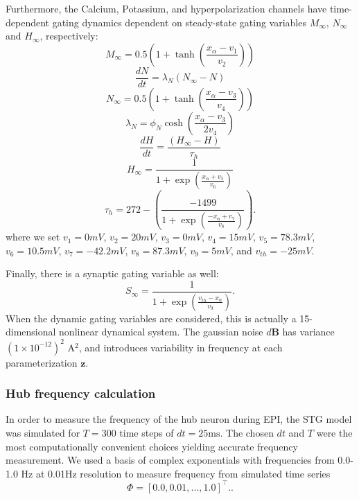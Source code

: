 \documentclass[11pt]{article}
\begin{document}
Furthermore, the Calcium, Potassium, and hyperpolarization channels have time-dependent gating dynamics dependent on steady-state gating variables $M_\infty$, $N_\infty$ and $H_\infty$, respectively:
\begin{equation}  M_{\infty} = 0.5 \left( 1 + \tanh \left( \frac{x_\alpha - v_1}{v_2} \right) \right) \end{equation}
\begin{equation}  \frac{dN}{dt} = \lambda_N (N_\infty - N)  \end{equation}
\begin{equation}  N_\infty = 0.5 \left( 1 + \tanh \left( \frac{x_\alpha - v_3}{v_4} \right) \right) \end{equation}
\begin{equation}  \lambda_N = \phi_N \cosh \left( \frac{x_\alpha - v_3}{2 v_4} \right) \end{equation}
\begin{equation}  \frac{dH}{dt} = \frac{\left( H_\infty - H \right)}{\tau_h} \end{equation}
\begin{equation}  H_\infty = \frac{1}{1 + \exp \left( \frac{x_\alpha + v_5}{v_6} \right)} \end{equation}
\begin{equation}  \tau_h = 272 - \left( \frac{-1499}{1 + \exp \left( \frac{-x_\alpha + v_7}{v_8} \right)} \right).
 \end{equation}
where we set $v_1 = 0mV$, $v_2  = 20mV$, $v_3 = 0mV$, $v_4 = 15mV$, $v_5 = 78.3mV$,
$v_6 = 10.5mV$, $v_7 = -42.2mV$, $v_8 = 87.3mV$, $v_9 = 5mV$, and $v_{th} = -25mV$.  

Finally, there is a synaptic gating variable as well:
\begin{equation} S_\infty = \frac{1}{1 + \exp \left( \frac{v_{th} - x_\alpha}{v_9} \right)} .
\end{equation}
When the dynamic gating variables are considered, this is actually a 15-dimensional nonlinear dynamical system.  
The gaussian noise $d\mathbf{B}$ has variance $(1 \times 10^{-12})^2$ A$^2$, and introduces variability in frequency at each parameterization $\mathbf{z}$.

\subsubsection{Hub frequency calculation} \label{methods_stg_hub}
In order to measure the frequency of the hub neuron during EPI, the STG model was simulated for $T = 300$ time steps of $dt = 25\text{ms}$.  
The chosen $dt$ and $T$ were the most computationally convenient choices yielding accurate frequency measurement.  
We used a basis of complex exponentials with frequencies from 0.0-1.0 Hz at 0.01Hz resolution to measure frequency from simulated time series
\begin{equation}
\Phi = \left[ 0.0, 0.01, ..., 1.0 \right]^\top..
\end{equation}
\end{document}
